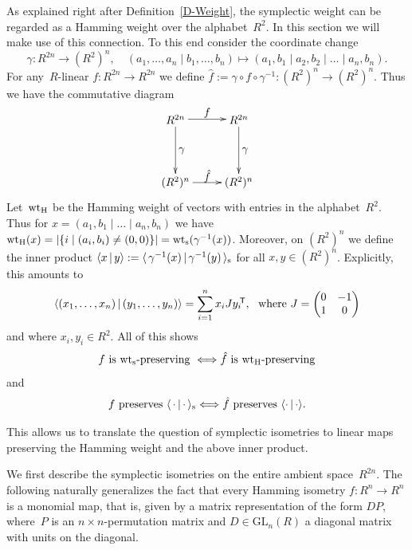 \documentclass[11pt]{article}
\theoremstyle{definition}
\numberwithin{equation}{section}
\newcommand{\wts}{\mbox{${\rm wt}_{\rm s}$}}
\newcommand{\wtH}{\mbox{${\rm wt}_{\rm H}$}}
\newcommand{\T}{\mbox{$\!^{\sf T}$}}
\newcommand{\inner}[2]{\mbox{$\langle{#1}\,|\,{#2}\rangle$}}
\newcommand{\inners}[2]{\mbox{$\langle{\,{#1}\,}|\,{#2}\,\rangle_{\rm s}$}}
\newcommand{\GL}{\mathrm{GL}}
\newcounter{alp}
\begin{document}
As explained right after Definition~\ref{D-Weight}, the symplectic weight can be regarded as a Hamming weight over the alphabet~$R^2$.
In this section we will make use of this connection.
To this end consider the coordinate change
\[
  \gamma: R^{2n}\longrightarrow (R^2)^n,\quad  (a_1,\ldots,a_n\mid b_1,\ldots,b_n)\longmapsto (a_1,b_1\mid a_2,b_2\mid \ldots\mid a_n,b_n).
\]
For any~$R$-linear $f:R^{2n}\longrightarrow R^{2n}$ we define $\hat{f}:=\gamma\circ f\circ\gamma^{-1}: (R^2)^n\longrightarrow(R^2)^n$.
Thus we have the commutative diagram
\begin{equation}\label{e-Diagram}
\begin{array}{l}
   \begin{xy}
   (0,0)*+{(R^2)^n}="a"; (20,0)*+{(R^2)^n}="b";%
   (0,20)*+{R^{2n}}="c"; (20,20)*+{R^{2n}}="d";%
   {\ar "a";"b"}?*!/_2mm/{\hat{f}};
   {\ar "c";"d"}?*!/_2mm/{f};%
   {\ar "c";"a"}?*!/_2mm/{\gamma};
   {\ar "d";"b"}?*!/_2mm/{\gamma};
   \end{xy}
\end{array}
\end{equation}
Let~$\wtH$ be the Hamming weight of vectors with entries in the alphabet~$R^2$.
Thus for $x=(a_1,b_1\mid  \ldots\mid a_n,b_n)$ we have
$\wtH(x) =|\{i\mid (a_i,b_i)\neq(0,0)\}|=\wts(\gamma^{-1}(x))$.
Moreover, on $(R^2)^n$ we define the inner product $\inner{x}{y}:=\inners{\gamma^{-1}(x)}{\gamma^{-1}(y)}$ for all $x,y\in(R^2)^n$.
Explicitly, this amounts to
\begin{equation}\label{e-J}
  \inner{(x_1,\ldots,x_n)}{(y_1,\ldots,y_n)}=\sum_{i=1}^n x_iJy_i\T,
    \ \text{ where }J=\begin{pmatrix}0&-1\\1&0\end{pmatrix}
\end{equation}
and where $x_i,y_i\in R^2$.
All of this shows
\begin{equation}\label{e-ffhatw}
   f \text{ is $\wts$-preserving }\Longleftrightarrow \hat{f}\text{ is $\wtH$-preserving}
\end{equation}
and
\begin{equation}\label{e-ffhatp}
   f \text{ preserves }\inners{\cdot}{\cdot}\Longleftrightarrow \hat{f}\text{ preserves }\inner{\cdot}{\cdot}.
\end{equation}

This allows us to translate the question of symplectic isometries to linear maps preserving the Hamming weight and the
above inner product.


We first describe the symplectic isometries on the entire ambient space~$R^{2n}$.
The following naturally generalizes the fact that every Hamming isometry $f:R^n\longrightarrow R^n$ is a monomial map, that is, given by a matrix representation of the form $DP$, where~$P$ is an $n\times n$-permutation matrix and $D\in\GL_n(R)$ a diagonal matrix with units on the diagonal.
\end{document}
